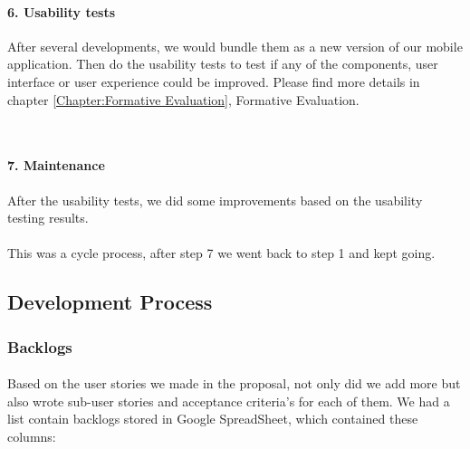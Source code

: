 \documentclass[12pt,a4paper]{article}
\begin{document}
          \paragraph{6. Usability tests}After several developments, we would bundle them as a new version of our mobile application. Then do the usability tests to test if any of the components, user interface or user experience could be improved. Please find more details in chapter \ref{Chapter:Formative Evaluation}, Formative Evaluation.
          
          \paragraph{7. Maintenance}After the usability tests, we did some improvements based on the usability testing results. 
          
          \paragraph{}This was a cycle process, after step 7 we went back to step 1 and kept going.

      \subsection{Development Process}
        \subsubsection{Backlogs}
          \label{section:Development Process - Backlogs}
          \paragraph{}Based on the user stories we made in the proposal, not only did we add more but also wrote sub-user stories and acceptance criteria's for each of them. We had a list contain backlogs stored in Google SpreadSheet, which contained these columns: 
\end{document}
